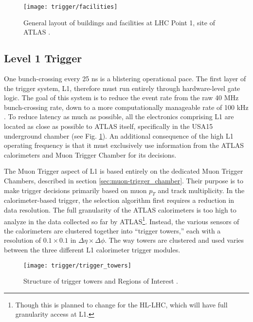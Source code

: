     \begin{figure}[h]
        \texttt{[image: trigger/facilities]}
        \caption{General layout of buildings and facilities at LHC Point 1, site of ATLAS \cite{trigger_tdr}.}
        \label{fig:facilities}
    \end{figure}


    \subsection{Level 1 Trigger}\label{sec:L1}

        One bunch-crossing every 25 ns is a blistering operational pace.
        The first layer of the trigger system, L1, therefore must run entirely through hardware-level gate logic.
        The goal of this system is to reduce the event rate from the raw 40 MHz bunch-crossing rate,
            down to a more computationally manageable rate of 100 kHz \cite{trigger_run2}.
        To reduce latency as much as possible, all the electronics comprising L1 are located as close as possible to ATLAS itself, specifically in the USA15 underground chamber \cite{trigger_tdr} (see Fig. \ref{fig:facilities}).
        An additional consequence of the high L1 operating frequency
            is that it must exclusively use information from the ATLAS calorimeters and Muon Trigger Chamber for its decisions.

        The Muon Trigger aspect of L1 is based entirely on the dedicated Muon Trigger Chambers,
            described in section \ref{sec:muon-trigger_chamber}.
        Their purpose is to make trigger decisions primarily based on muon $p_T$ and track multiplicity\cite{trigger_run1}.
        In the calorimeter-based trigger, the selection algorithm first requires a reduction in data resolution.
        The full granularity of the ATLAS calorimeters is too high to analyze in the data collected so far by ATLAS\footnote{
            Though this is planned to change for the HL-LHC, which will have full granularity access at L1.
        }.
        Instead, the various sensors of the calorimeters are clustered together into ``trigger towers,''
            each with a resolution of $0.1 \times 0.1$ in $\Delta \eta \times \Delta \phi$.
        The way towers are clustered and used varies between the three different L1 calorimeter trigger modules.

        \begin{figure}[h]
            \texttt{[image: trigger/trigger\_towers]}
            \caption{Structure of trigger towers and Regions of Interest \cite{L1_calo_run1}.}
            \label{fig:trigger_towers}
        \end{figure}


